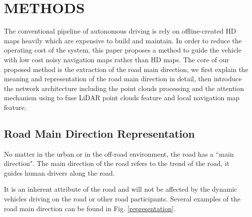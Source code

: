 \documentclass[letterpaper,10 pt,conference]{ieeeconf}  %
\begin{document}
\section{METHODS}\label{methods}
The conventional pipeline of autonomous driving is rely on offline-created HD maps heavily which are expensive to build and maintain. In order to reduce the operating cost of the system, this paper proposes a method to guide the vehicle with low cost noisy navigation maps rather than HD maps. The core of our proposed method is the extraction of the road main direction, we first explain the meaning and representation of the road main direction in detail, then introduce the network architecture including the point clouds processing and the attention mechanism using to fuse LiDAR point clouds feature and local navigation map feature.

\subsection{Road Main Direction Representation}
No matter in the urban or in the off-road environment, the road has a ``main direction". The main direction of the road refers to the trend of the road, it guides human drivers along the road.

It is an inherent attribute of the road and will not be affected by the dynamic vehicles driving on the road or other road participants. Several examples of the road main direction can be found in Fig. \ref{representation}.
\end{document}
